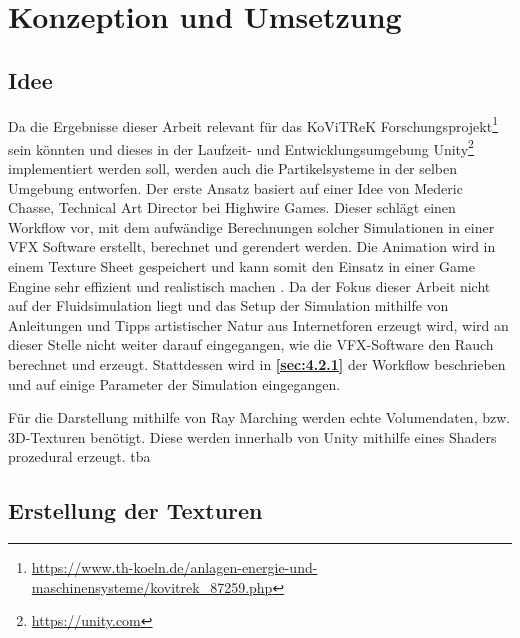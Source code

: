 \section{Konzeption und Umsetzung}
\label{sec:4}
\subsection{Idee}
\label{sec:4.1}

Da die Ergebnisse dieser Arbeit relevant für das KoViTReK Forschungsprojekt\footnote{\url{https://www.th-koeln.de/anlagen-energie-und-maschinensysteme/kovitrek\_87259.php}}
sein könnten und dieses in der Laufzeit- und Entwicklungsumgebung Unity\footnote{\url{https://unity.com}}
implementiert werden soll, werden auch die Partikelsysteme in der selben Umgebung entworfen.
Der erste Ansatz basiert auf einer Idee von Mederic Chasse, Technical Art Director  bei Highwire Games.
Dieser schlägt einen Workflow vor, mit dem aufwändige Berechnungen solcher Simulationen in einer VFX Software erstellt, berechnet und gerendert werden.
Die Animation wird in einem Texture Sheet gespeichert und kann somit den Einsatz in einer Game Engine sehr effizient und realistisch machen \parencite{Chasse2018}. 
Da der Fokus dieser Arbeit nicht auf der Fluidsimulation liegt und das Setup der Simulation mithilfe von Anleitungen
und Tipps artistischer Natur aus Internetforen erzeugt wird, wird an dieser Stelle nicht weiter darauf eingegangen, wie die VFX-Software den Rauch berechnet und erzeugt.
Stattdessen wird in \textbf{\autoref{sec:4.2.1}} der Workflow beschrieben und auf einige Parameter der Simulation eingegangen.

Für die Darstellung mithilfe von Ray Marching werden echte Volumendaten, bzw. 3D-Texturen benötigt. Diese werden innerhalb von Unity
mithilfe eines Shaders prozedural erzeugt. tba


\subsection{Erstellung der Texturen}
\label{sec:4.2}


